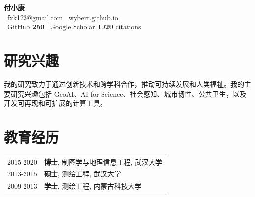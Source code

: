 \documentclass[11pt]{article}
\begin{document}
\begin{center}
	\LARGE\textbf{付小康}\normalsize \\[0.4em]
	{\color{emailcolor}}~\href{mailto:fxk123@gmail.com}{fxk123@gmail.com} \quad
	{\color{webcolor}}~\href{https://wybert.github.io}{wybert.github.io} \\[0.3em]
	{\color{githubcolor}}~\href{https://github.com/wybert}{GitHub} \textbf{250} {\color{starcolor}} \quad
	{\color{googlecolor}}~\href{https://scholar.google.com.hk/citations?user=H9RAbHIAAAAJ}{Google Scholar} \textbf{1020} citations
\end{center}
\vspace{0.5em}

\RaggedRight

\section*{研究兴趣}

我的研究致力于通过创新技术和跨学科合作，推动可持续发展和人类福祉。我的主要研究兴趣包括 GeoAI、AI for Science、社会感知、城市韧性、公共卫生，以及开发可再现和可扩展的计算工具。

\section*{教育经历}

\renewcommand{\thefootnote}{\fnsymbol{footnote}}
\setcounter{footnote}{0}

\begin{longtable}[l]{@{}p{} p{}}
	2015-2020 & \textbf{博士}, 制图学与地理信息工程, 武汉大学 \\
	2013-2015 & \textbf{硕士}, 测绘工程, 武汉大学       \\
	2009-2013 & \textbf{学士}, 测绘工程, 内蒙古科技大学
\end{longtable}

\renewcommand{\thefootnote}{\arabic{footnote}}
\setcounter{footnote}{1}

\end{document}
